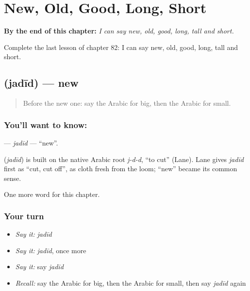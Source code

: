 
\chapter{New, Old, Good, Long, Short}
\label{ch:ar-new-old-good-long-short}

\begin{chapteropening}
\textbf{By the end of this chapter:} \emph{I can say new, old, good, long, tall and short.}

Complete the last lesson of chapter 82: I can say new, old, good, long, tall and short.
\end{chapteropening}

\section[\texorpdfstring{\ar{جديد} (jadīd)}{جديد (jadīd)}]{ (jadīd) — new}

\label{lesson:AR-C82-jadid}



\begin{quote}
Before the new one: say the Arabic for big, then the Arabic for small.
\end{quote}

\subsection*{You'll want to know: }
\textbf{} — \emph{jadīd} — \textquotedblleft{}new\textquotedblright{}.

\begin{cousinweb}
\textbf{} (\emph{jadīd}) is built on the native Arabic root \emph{j-d-d}, \textquotedblleft{}to cut\textquotedblright{} (Lane). Lane gives \emph{jadīd} first as \textquotedblleft{}cut, cut off\textquotedblright{}, as cloth fresh from the loom; \textquotedblleft{}new\textquotedblright{} became its common sense.
\end{cousinweb}

\begin{grammarlens}[title={What you've built}]
One more word for this chapter.
\end{grammarlens}

\subsection*{Your turn}
\begin{itemize}
\raggedright
  \item \emph{Say it:} \emph{jadīd}
  \item \emph{Say it:} \emph{jadīd}, once more
  \item \emph{Say it:} say \emph{jadīd}
  \item \emph{Recall:} say the Arabic for big, then the Arabic for small, then say \emph{jadīd} again
\end{itemize}

